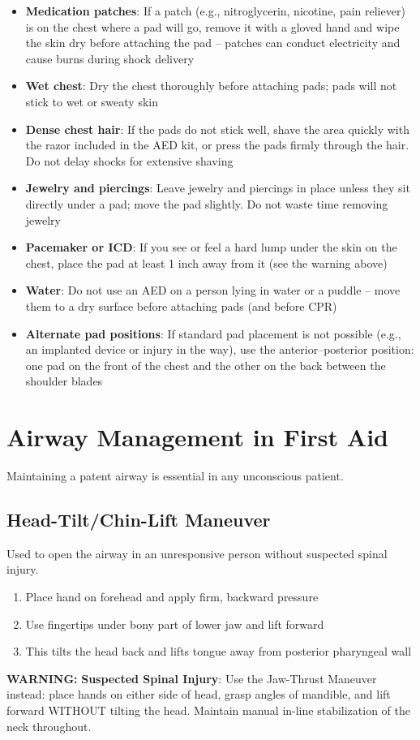 \begin{itemize}[leftmargin=*]
  \item \textbf{Medication patches}: If a patch (e.g., nitroglycerin, nicotine, pain reliever) is on the chest where a pad will go, remove it with a gloved hand and wipe the skin dry before attaching the pad -- patches can conduct electricity and cause burns during shock delivery
  \item \textbf{Wet chest}: Dry the chest thoroughly before attaching pads; pads will not stick to wet or sweaty skin
  \item \textbf{Dense chest hair}: If the pads do not stick well, shave the area quickly with the razor included in the AED kit, or press the pads firmly through the hair. Do not delay shocks for extensive shaving
  \item \textbf{Jewelry and piercings}: Leave jewelry and piercings in place unless they sit directly under a pad; move the pad slightly. Do not waste time removing jewelry
  \item \textbf{Pacemaker or ICD}: If you see or feel a hard lump under the skin on the chest, place the pad at least 1 inch away from it (see the warning above)
  \item \textbf{Water}: Do not use an AED on a person lying in water or a puddle -- move them to a dry surface before attaching pads (and before CPR)
  \item \textbf{Alternate pad positions}: If standard pad placement is not possible (e.g., an implanted device or injury in the way), use the anterior--posterior position: one pad on the front of the chest and the other on the back between the shoulder blades
\end{itemize}

\section{Airway Management in First Aid}

Maintaining a patent airway is essential in any unconscious patient.

\subsection{Head-Tilt/Chin-Lift Maneuver}

Used to open the airway in an unresponsive person without suspected spinal injury.

\begin{enumerate}[leftmargin=*]
\item Place hand on forehead and apply firm, backward pressure
\item Use fingertips under bony part of lower jaw and lift forward
\item This tilts the head back and lifts tongue away from posterior pharyngeal wall
\end{enumerate}
\textbf{WARNING:} \textbf{Suspected Spinal Injury}: Use the Jaw-Thrust Maneuver instead: place hands on either side of head, grasp angles of mandible, and lift forward WITHOUT tilting the head. Maintain manual in-line stabilization of the neck throughout.

